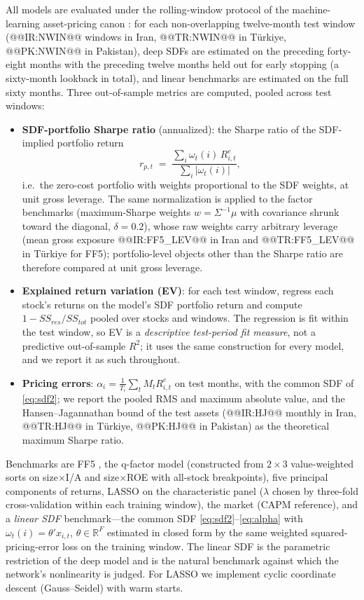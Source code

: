 \documentclass[12pt]{article}
\begin{document}
All models are evaluated under the rolling-window protocol of the machine-learning asset-pricing canon \citep{lettaupelger2020,gkx2020}: for each non-overlapping twelve-month test window (@@IR:NWIN@@ windows in Iran, @@TR:NWIN@@ in T\"urkiye, @@PK:NWIN@@ in Pakistan), deep SDFs are estimated on the preceding forty-eight months with the preceding twelve months held out for early stopping (a sixty-month lookback in total), and linear benchmarks are estimated on the full sixty months. Three out-of-sample metrics are computed, pooled across test windows:
\begin{itemize}
\item \textbf{SDF-portfolio Sharpe ratio} (annualized): the Sharpe ratio of the SDF-implied portfolio return
\begin{equation}
r_{p,t} \;=\; \frac{\sum_i \omega_t(i)\, R^e_{i,t}}{\sum_i |\omega_t(i)|},
\label{eq:rp}
\end{equation}
i.e.\ the zero-cost portfolio with weights proportional to the SDF weights, at unit gross leverage. The same normalization is applied to the factor benchmarks (maximum-Sharpe weights $w=\Sigma^{-1}\mu$ with covariance shrunk toward the diagonal, $\delta=0.2$), whose raw weights carry arbitrary leverage (mean gross exposure @@IR:FF5_LEV@@ in Iran and @@TR:FF5_LEV@@ in T\"urkiye for FF5); portfolio-level objects other than the Sharpe ratio are therefore compared at unit gross leverage.
\item \textbf{Explained return variation (EV)}: for each test window, regress each stock's returns on the model's SDF portfolio return and compute $1 - SS_{res}/SS_{tot}$ pooled over stocks and windows. The regression is fit within the test window, so EV is a \emph{descriptive test-period fit measure}, not a predictive out-of-sample $R^2$; it uses the same construction for every model, and we report it as such throughout.
\item \textbf{Pricing errors}: $\alpha_i = \frac{1}{T_i}\sum_t M_t R^e_{i,t}$ on test months, with the common SDF of \eqref{eq:sdf2}; we report the pooled RMS and maximum absolute value, and the Hansen--Jagannathan bound of the test assets (@@IR:HJ@@ monthly in Iran, @@TR:HJ@@ in T\"urkiye, @@PK:HJ@@ in Pakistan) as the theoretical maximum Sharpe ratio.
\end{itemize}
Benchmarks are FF5 \citep{ff2015}, the q-factor model \citep{hxz2015} (constructed from $2\times3$ value-weighted sorts on size$\times$I/A and size$\times$ROE with all-stock breakpoints), five principal components of returns, LASSO on the characteristic panel ($\lambda$ chosen by three-fold cross-validation within each training window), the market (CAPM reference), and a \emph{linear SDF} benchmark---the common SDF \eqref{eq:sdf2}--\eqref{eq:alpha} with $\omega_t(i)=\theta' x_{i,t}$, $\theta\in\mathbb{R}^F$ estimated in closed form by the same weighted squared-pricing-error loss on the training window. The linear SDF is the parametric restriction of the deep model and is the natural benchmark against which the network's nonlinearity is judged. For LASSO we implement cyclic coordinate descent (Gauss--Seidel) with warm starts.
\end{document}
